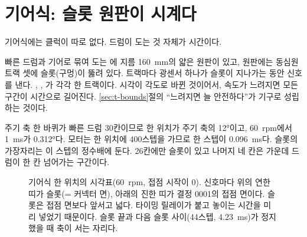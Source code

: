 \section{기어식: 슬롯 원판이 시계다}\label{sec:t-gear}

기어식에는 클럭이 따로 없다. 드럼이 도는 것 자체가 시간이다.

\Why 빠른 드럼과 기어로 묶여 도는 에 지름 160~mm의 얇은 원판이 있고, 원판에는 동심원 트랙 셋에
슬롯(구멍)이 뚫려 있다. 트랙마다 광센서 하나가 슬롯이 지나가는 동안 신호를 낸다. , ,
가 각각 한 트랙이다. 시각이 각도로 바뀐 것이어서, 속도가 느려지면 모든 구간이 시간으로 길어진다.
\ref{sec:t-bounds}절의 ``느려지면 늘 안전하다''가 기구로 성립하는 것이다.

주기 축 한 바퀴가 빠른 드럼 30칸이므로 한 위치가 주기 축의 12°이고, 60~rpm에서 1~ms가 0.312°다. 모터는 한 위치에
400스텝을 가므로 한 스텝이 0.096~ms다. 슬롯의 가장자리는 이 스텝의 정수배에 둔다. 26칸에만 슬롯이 있고 나머지
네 칸은 가운데 드럼이 한 칸 넘어가는  구간이다.

\begin{figure}[ht]
\centering
{}
\caption{기어식 한 위치의 시각표(60~rpm,  접점 시작이 0). 신호마다 위의 연한 띠가 슬롯(= 커넥터 면),
아래의 진한 띠가 결정 0001의 접점 면이다. 슬롯은 접점 면보다 앞서고 넓다. 타이밍 릴레이가 붙고 놓이는 시간을 미리 넣었기
때문이다.  슬롯 끝과 다음  슬롯 사이(44스텝, 4.23~ms)가 정지했을 때 축이 서는 자리다.}
\label{fig:t-slots}
\end{figure}

